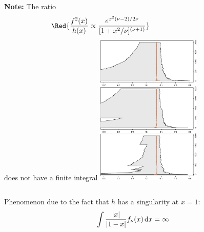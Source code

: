 \begin{slide}
\begin{columns}
{\bf Note:} The ratio
$$\Red{
{f^2(x) \over h(x) } \propto
{e^{x^2(\nu-2)/2\nu}\over [1 + x^2/\nu]^{(\nu+1)}}
}$$
does not have a finite integral
\includegraphics[width=5cm,height=\textwidth,angle=270]{figures/student.range.eps} 
\end{columns}
\fin

\end{slide}\begin{slide}
Phenomenon due to the fact that $h$ has a singularity at $x=1$:
$$
\int \frac{|x|}{|1-x|} f_\nu(x) \,\hbox{d}x = \infty
$$

\pause
{}
\fin


\end{slide}
